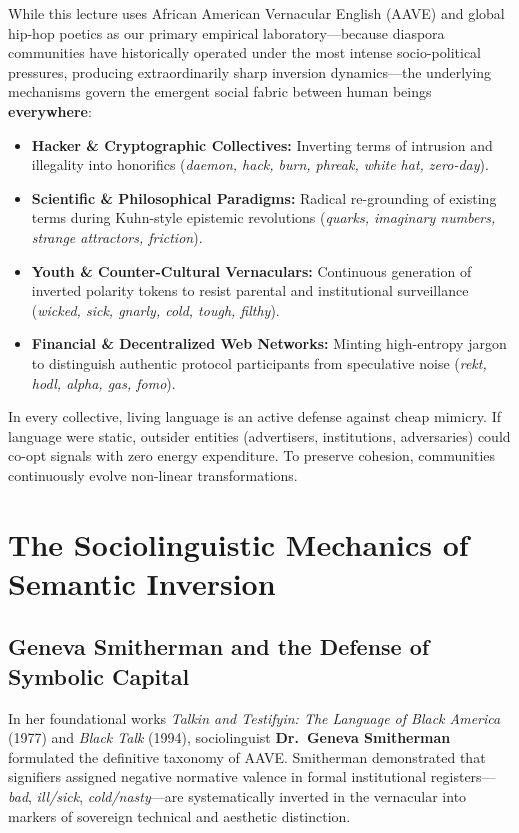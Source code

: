 \documentclass[11pt,letterpaper]{article}
\begin{document}
While this lecture uses African American Vernacular English (AAVE) and global hip-hop poetics as our primary empirical laboratory---because diaspora communities have historically operated under the most intense socio-political pressures, producing extraordinarily sharp inversion dynamics---the underlying mechanisms govern the emergent social fabric between human beings \textbf{everywhere}:
\begin{itemize}[itemsep=2pt, topsep=2pt]
    \item \textbf{Hacker \& Cryptographic Collectives:} Inverting terms of intrusion and illegality into honorifics (\textit{daemon, hack, burn, phreak, white hat, zero-day}).
    \item \textbf{Scientific \& Philosophical Paradigms:} Radical re-grounding of existing terms during Kuhn-style epistemic revolutions (\textit{quarks, imaginary numbers, strange attractors, friction}).
    \item \textbf{Youth \& Counter-Cultural Vernaculars:} Continuous generation of inverted polarity tokens to resist parental and institutional surveillance (\textit{wicked, sick, gnarly, cold, tough, filthy}).
    \item \textbf{Financial \& Decentralized Web Networks:} Minting high-entropy jargon to distinguish authentic protocol participants from speculative noise (\textit{rekt, hodl, alpha, gas, fomo}).
\end{itemize}
In every collective, living language is an active defense against cheap mimicry. If language were static, outsider entities (advertisers, institutions, adversaries) could co-opt signals with zero energy expenditure. To preserve cohesion, communities continuously evolve non-linear transformations.

\section{The Sociolinguistic Mechanics of Semantic Inversion}

\subsection{Geneva Smitherman and the Defense of Symbolic Capital}
In her foundational works \textit{Talkin and Testifyin: The Language of Black America} (1977) and \textit{Black Talk} (1994), sociolinguist \textbf{Dr.~Geneva Smitherman} formulated the definitive taxonomy of AAVE. Smitherman demonstrated that signifiers assigned negative normative valence in formal institutional registers---\textit{bad}, \textit{ill/sick}, \textit{cold/nasty}---are systematically inverted in the vernacular into markers of sovereign technical and aesthetic distinction.
\end{document}

